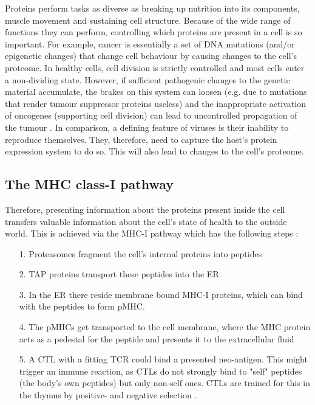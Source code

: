 \documentclass[msc,deptreport,ai]{infthesis} %
\begin{document}
		Proteins perform tasks as diverse as breaking up nutrition into its components, muscle movement and sustaining cell structure. Because of the wide range of functions they can perform, controlling which proteins are present in a cell is so important. For example, cancer is essentially a set of \gls{DNA} mutations (and/or epigenetic changes) that change cell behaviour by causing changes to the cell's proteome. In healthy cells, cell division is  strictly controlled and most cells enter a non-dividing state. However, if sufficient pathogenic changes to the genetic material accumulate, the brakes on this system can loosen (e.g. due to mutations that render tumour suppressor proteins useless) and the inappropriate activation of oncogenes (supporting cell division) can lead to uncontrolled propagation of the tumour \cite[Chapter 41, Section X]{pollard_cell_2016}. In comparison, a defining feature of viruses is their inability to reproduce themselves. They, therefore, need to capture the host's protein expression system to do so. This will also lead to changes to the cell's proteome.

	\subsection{The MHC class-I pathway}
	\label{subsec:bg_biology_pathway}
		Therefore, presenting information about the proteins present inside the cell transfers valuable information about the cell's state of health to the outside world. This is achieved via the \gls{MHC-I} pathway which has the following steps \cite{rock_present_2016}:
	
		\begin{itemize}
			\item[1.] Proteasomes fragment the cell's internal proteins into peptides
			\item[2.] \gls{TAP} proteins transport these peptides into the \gls{ER}
			\item[3.] In the \gls{ER} there reside membrane bound \gls{MHC-I} proteins, which can bind with the peptides to form \gls{pMHC}.
			\item[4.] The \glspl{pMHC} get transported to the cell membrane, where the \gls{MHC} protein acts as a pedestal for the peptide and presents it to the extracellular fluid 
			\item[5.] A \gls{CTL} with a fitting \gls{TCR} could bind a presented neo-antigen. This might trigger an immune reaction, as \glspl{CTL} do not strongly bind to "self" peptides (the body's own peptides) but only non-self ones. \glspl{CTL} are trained for this in the thymus by positive- and negative selection \cite{murphy_janeways_2017}.
		\end{itemize}
	
\end{document}
